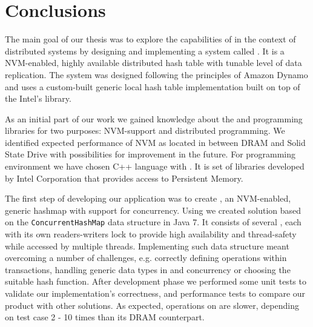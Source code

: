 \chapter{Conclusions} \label{Conclusion}


The main goal of our thesis was to explore the capabilities of \NVM in the context of distributed systems by designing and implementing a system called \DHTS. It is a NVM-enabled, highly available distributed hash table with tunable level of data replication.
The system was designed following the principles of Amazon Dynamo and uses a custom-built generic local hash table implementation built on top of the Intel's \libpmemobj library.


As an initial part of our work we gained knowledge about the \NVM and programming libraries for two purposes: NVM-support and distributed programming. 
We identified expected performance of NVM as located in between DRAM and Solid State Drive with possibilities for improvement in the future. 
For programming environment we have chosen C++ language with \PMDK. 
It is set of libraries developed by Intel Corporation that provides access to Persistent Memory.

The first step of developing our application was to create \PHT, an NVM-enabled, generic hashmap with support for concurrency.
Using \PMDK we created solution based on the \texttt{ConcurrentHashMap} data structure in Java 7. 
It consists of several \internalHashMaps, each with its own readers-writers lock to provide high availability and thread-safety while accessed by multiple threads. Implementing such data structure meant overcoming a number of challenges, e.g. correctly defining operations within transactions, handling generic data types in and concurrency or choosing the suitable hash function.
After development phase we performed some unit tests to validate our implementation's correctness, and performance tests to compare our product with other solutions.
As expected, operations on \PHT are slower, depending on test case 2 - 10 times than its DRAM counterpart.

